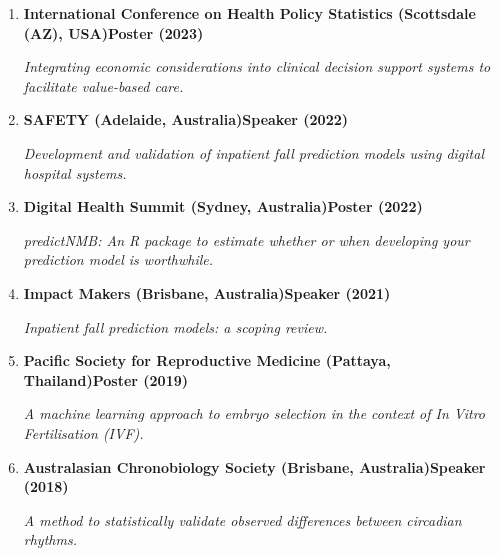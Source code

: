 \begin{enumerate}
	\item
		\textbf{International Conference on Health Policy Statistics (Scottsdale (AZ), USA)}\textbf{\hfill Poster (2023)}\par 
		\textit{Integrating economic considerations into clinical decision support systems to facilitate value-based care.}
	\item
		\textbf{SAFETY (Adelaide, Australia)}\textbf{\hfill Speaker (2022)}\par 
		\textit{Development and validation of inpatient fall prediction models using digital hospital systems.}
	\item
		\textbf{Digital Health Summit (Sydney, Australia)}\textbf{\hfill Poster (2022)}\par 
		\textit{predictNMB: An R package to estimate whether or when developing your prediction model is worthwhile.}
	\item
		\textbf{Impact Makers (Brisbane, Australia)}\textbf{\hfill Speaker (2021)}\par 
		\textit{Inpatient fall prediction models: a scoping review.}
	\item
		\textbf{Pacific Society for Reproductive Medicine (Pattaya, Thailand)}\textbf{\hfill Poster (2019)}\par 
		\textit{A machine learning approach to embryo selection in the context of In Vitro Fertilisation (IVF).}
	\item
		\textbf{Australasian Chronobiology Society (Brisbane, Australia)}\textbf{\hfill Speaker (2018)}\par 
		\textit{A method to statistically validate observed differences between circadian rhythms.}
\end{enumerate}\par
